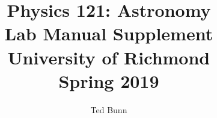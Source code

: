 \documentclass[twoside]{report}
\begin{document}
\title{Physics 121: Astronomy \\ Lab Manual Supplement \\ University of Richmond
\\ Spring 2019}
\author{Ted Bunn}



\end{document}
